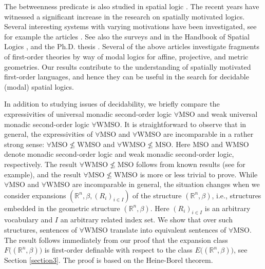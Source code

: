 \documentclass{LMCS}
\theoremstyle{plain}
\newcommand{\rp}{(\mathbb{R}^n,\beta)}
\newcommand{\rpm}{\mathbb{R}^n,\beta}
\begin{document}
%
The betweenness predicate is also studied in spatial logic \cite{handbookofspatial}. The recent years 
have witnessed a significant increase in the research on spatially motivated logics.
Several interesting systems
with varying motivations have been investigated, see for
example the articles
\cite{vanBenthemAiello:2002, Balbianietal:1997, BalbianiGoranko:2002,
HodkinsonHussain, KoPrWoZa:2010, Nenov:2010, Shere:2010,Tinchev,Venema:1999}.
See also the surveys \cite{AielloPrattHartmannvanBenthem:2007} and \cite{Balbianietal:2007} in the
Handbook of Spatial Logics
\cite{handbookofspatial}, and the Ph.D. thesis \cite{Griffiths:2008}.
Several of the above articles investigate
fragments of first-order
theories by way of modal logics for
affine, projective, and metric geometries. Our results contribute to the 
understanding of spatially motivated first-order languages, and hence they can be useful in the
search for decidable (modal) spatial logics.
%





%
In addition to studying issues of decidability, we briefly 
compare the expressivities of universal monadic second-order logic $\forall\mathrm{MSO}$ 
and weak universal monadic second-order logic $\forall\mathrm{WMSO}$.
It is straightforward to observe that in general,
the expressivities of $\forall\mathrm{MSO}$ and $\forall\mathrm{WMSO}$ are incomparable in a rather 
strong sense: $\forall\mathrm{MSO}\not\leq\mathrm{WMSO}$ and $\forall\mathrm{WMSO}\not\leq\mathrm{MSO}$.
Here $\mathrm{MSO}$ and $\mathrm{WMSO}$ denote monadic second-order logic and weak monadic second-order logic,
respectively. The result $\forall\mathrm{WMSO}\not\leq\mathrm{MSO}$ follows from known
results (see \cite{tenCate:2011} for example), and the result $\forall\mathrm{MSO}\not\leq\mathrm{WMSO}$ is
more or less trivial to prove.
While $\forall\mathrm{MSO}$ and $\forall\mathrm{WMSO}$ are
incomparable in general,
the situation changes when we consider
expansions $(\rpm,(R_i)_{i\in I})$ of the structure $\rp$, i.e., structures
embedded in the geometric structure $\rp$. Here $(R_i)_{i\in I}$ is an arbitrary vocabulary and $I$ an
arbitrary related index set. We show that over such structures,
sentences of $\forall\mathrm{WMSO}$ translate into equivalent
sentences of $\forall\mathrm{MSO}$. The result follows immediately from
our proof that the expansion class $F\bigl((\mathbb{R}^n,\beta)\bigr)$
%
is first-order definable with respect to the class $E\bigl((\mathbb{R}^n,\beta)\bigl)$, see Section \ref{section3}.
%
The proof is based on the Heine-Borel theorem.
%
\end{document}
